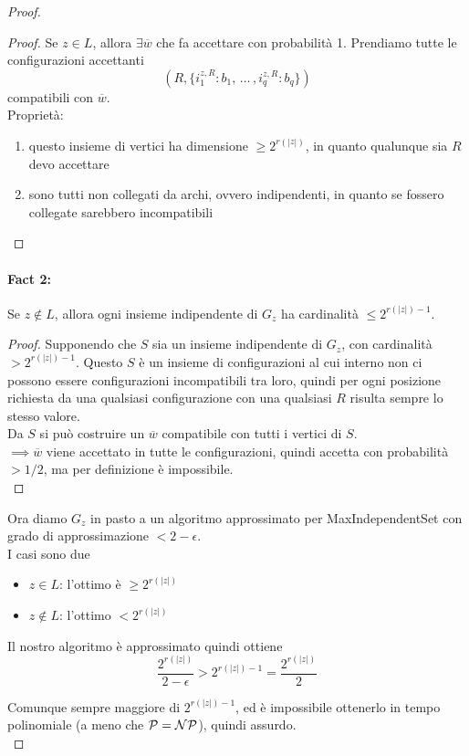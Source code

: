 \begin{proof}
	\begin{proof}
 		Se $z \in L$, allora $\exists \overline w$ che fa accettare con probabilità 1. Prendiamo tutte le configurazioni accettanti
		$$
		(R, \{i_1^{z,R}: b_1, \, \dots \, , i_q^{z,R}: b_q\})
		$$
		compatibili con $\overline w$.\\
		
		Proprietà:
		\begin{enumerate}
			\item questo insieme di vertici ha dimensione $\geq 2^{r(|z|)}$, in quanto qualunque sia $R$ devo accettare
			\item sono tutti non collegati da archi, ovvero indipendenti, in quanto se fossero collegate sarebbero incompatibili
		\end{enumerate}
		\nn
	\end{proof}
	
	\paragraph{Fact 2:} Se $z \notin L$, allora ogni insieme indipendente di $G_z$ ha cardinalità $\leq 2^{r(|z|) - 1}$.\\
	
	\begin{proof}
		Supponendo che $S$ sia un insieme indipendente di $G_z$, con cardinalità $> 2^{r(|z|) - 1}$. Questo $S$ è un insieme di configurazioni al cui interno non ci possono essere configurazioni incompatibili tra loro, quindi per ogni posizione richiesta da una qualsiasi configurazione con una qualsiasi $R$ risulta sempre lo stesso valore.\\
		
		Da $S$ si può costruire un $\overline w$ compatibile con tutti i vertici di $S$.\\
		$\implies \overline w$ viene accettato in tutte le configurazioni, quindi accetta con probabilità $> 1/2$, ma per definizione è impossibile.\\
	\end{proof}
	
	Ora diamo $G_z$ in pasto a un algoritmo approssimato per MaxIndependentSet con grado di approssimazione $< 2 - \epsilon$.\\
	I casi sono due
	\begin{itemize}
		\item $z \in L$: l'ottimo è $\geq 2^{r(|z|)}$
		\item $z \notin L$: l'ottimo $< 2^{r(|z|)}$
	\end{itemize}
	
	Il nostro algoritmo è approssimato quindi ottiene
	$$ \frac{2^{r(|z|)}}{2 - \epsilon} > 2^{r(|z|) - 1} = \frac{2^{r(|z|)}}{2} $$
	
	Comunque sempre maggiore di $2^{r(|z|)-1}$, ed è impossibile ottenerlo in tempo polinomiale (a meno che $\mathcal{P} = \mathcal{NP}$), quindi assurdo.\\
\end{proof}